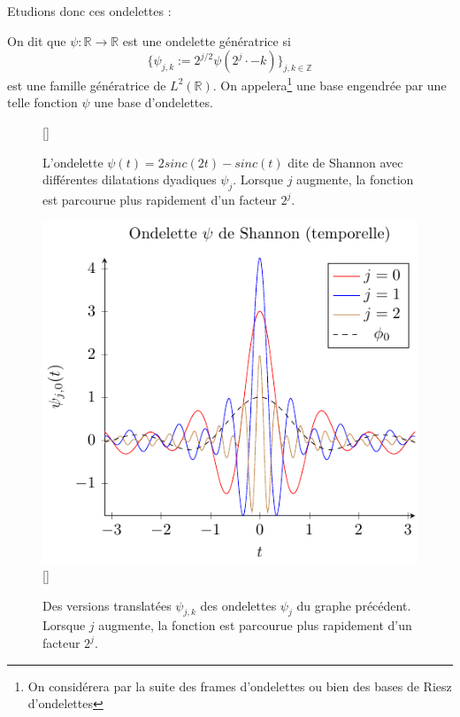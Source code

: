 Etudions donc ces ondelettes :
\begin{definition}
	On dit que $\psi:\mathbb{R} \to \mathbb{R}$ est une ondelette génératrice si 
	\begin{equation}
		\{\psi_{j,k} := 2^{j/2}\psi(2^j\cdot - k)\}_{j,k \in \mathbb{Z}}
	\end{equation}
	est une famille génératrice de $L^2(\mathbb{R})$.
	On appelera\footnote{On considérera par la suite des frames d'ondelettes ou bien des bases de Riesz d'ondelettes} une base engendrée par une telle fonction $\psi$ une base d'ondelettes.
\end{definition}
\begin{figure}
	[\FBwidth]
	{\caption{L'ondelette $\psi(t) = 2sinc(2t) - sinc(t)$ dite de Shannon avec différentes dilatations dyadiques $\psi_j$. Lorsque $j$ augmente, la fonction est parcourue plus rapidement d'un facteur $2^j$.}}
	{\includegraphics{Figs/shannon}}
	\label{fig:shannon}
	[\FBwidth]
		{\caption{Des versions translatées $\psi_{j,k}$ des ondelettes $\psi_j$ du graphe précédent. Lorsque $j$ augmente, la fonction est parcourue plus rapidement d'un facteur $2^j$.}}

\end{figure}

